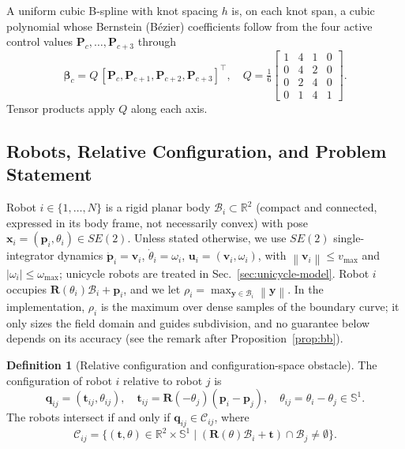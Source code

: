 \documentclass[journal]{IEEEtran}
\theoremstyle{definition}
\newtheorem{definition}{Definition}
\newcommand{\R}{\mathbb{R}}
\newcommand{\Sone}{\mathbb{S}^1}
\newcommand{\norm}[1]{\left\lVert #1\right\rVert}
\newcommand{\CO}{\mathcal{C}}
\newcommand{\Rot}{\mathbf{R}}
\begin{document}
A uniform cubic B-spline with knot spacing $h$ is, on each knot span, a cubic polynomial whose
Bernstein (B\'ezier) coefficients follow from the four active control values
$\mathbf P_{c},\dots,\mathbf P_{c+3}$ through~\cite{farin2002curves,jo2027semantic}
\begin{equation}\label{eq:b2b}
\boldsymbol\beta_c=Q\,[\mathbf P_{c},\mathbf P_{c+1},\mathbf P_{c+2},\mathbf P_{c+3}]^{\top},\quad
Q=\tfrac16\begin{bmatrix}1&4&1&0\\0&4&2&0\\0&2&4&0\\0&1&4&1\end{bmatrix}.
\end{equation}
Tensor products apply $Q$ along each axis.

\subsection{Robots, Relative Configuration, and Problem Statement}
Robot $i\in\{1,\dots,N\}$ is a rigid planar body $\mathcal B_i\subset\R^2$ (compact and connected,
expressed in its body frame, not necessarily convex) with pose $\mathbf x_i=(\mathbf p_i,\theta_i)\in SE(2)$.
Unless stated otherwise, we use $SE(2)$ single-integrator dynamics $\dot{\mathbf p}_i=\mathbf v_i$,
$\dot\theta_i=\omega_i$, $\mathbf u_i=(\mathbf v_i,\omega_i)$, with $\norm{\mathbf v_i}\le v_{\max}$
and $|\omega_i|\le\omega_{\max}$; unicycle robots are treated in Sec.~\ref{sec:unicycle-model}.
Robot $i$ occupies $\Rot(\theta_i)\mathcal B_i+\mathbf p_i$, and we let
$\rho_i=\max_{\mathbf y\in\mathcal B_i}\norm{\mathbf y}$. In the implementation, $\rho_i$ is the
maximum over dense samples of the boundary curve; it only sizes the field domain and guides
subdivision, and no guarantee below depends on its accuracy (see the remark after
Proposition~\ref{prop:bb}).

\begin{definition}[Relative configuration and configuration-space obstacle]
The configuration of robot $i$ relative to robot $j$ is
\begin{equation}\label{eq:qrel}
\mathbf q_{ij}=(\mathbf t_{ij},\theta_{ij}),\quad
\mathbf t_{ij}=\Rot(-\theta_j)(\mathbf p_i-\mathbf p_j),\quad
\theta_{ij}=\theta_i-\theta_j\in\Sone .
\end{equation}
The robots intersect if and only if $\mathbf q_{ij}\in\CO_{ij}$, where
\begin{equation}\label{eq:CO}
\CO_{ij}=\{(\mathbf t,\theta)\in\R^2\times\Sone\mid
(\Rot(\theta)\mathcal B_i+\mathbf t)\cap\mathcal B_j\neq\emptyset\}.
\end{equation}
\end{definition}
\end{document}
